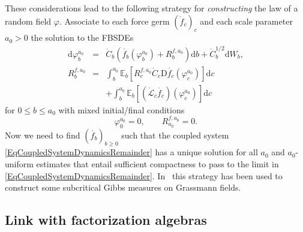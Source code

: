 \documentclass[reprint,aps]{revtex4-2}
\newcommand{\mathD}{\mathrm{D}}
\newcommand{\mathd}{\mathrm{d}}
\newcommand{\tmtextit}[1]{\textit{{{#1}}}}
\newcommand{\bbE}{\mathbb{E}}
\begin{document}
These considerations lead to the following strategy for
\tmtextit{constructing} the law of a random field $\varphi$. Associate to each
force germ $(\ring{f}_c)_c$ and each scale parameter $a_0 > 0$ the solution to
the FBSDEs
\begin{equation}
  \begin{array}{lll}
    \mathd \varphi^{a_0}_b & = & \dot{C}_b (\ring{f_b}  (\varphi^{a_0}_b) +
    R^{f, a_0}_b) \mathd b + \dot{C}_b^{1 / 2} \mathd W_b,\\
    R^{f, a_0}_b & = & \int_b^{a_0} \bbE_b  [R^{f, a_0}_c  \dot{C}_c \mathD
    \ring{f_c} (\varphi^{a_0}_c)] \mathd c\\
    &  & + \int_b^{a_0} \bbE_b [(\ring{\mathscr{L}}_c  \ring{f_c})
    (\varphi^{a_0}_c)] \mathd c
  \end{array} \label{EqCoupledSystemDynamicsRemainder}
\end{equation}
for $0 \leqslant b \leqslant a_0$ with mixed initial/final conditions
\begin{equation}
  \varphi_0^{a_0} = 0, \qquad R^{f, a_0}_{a_0} = 0.
\end{equation}
Now we need to find $(\ring{f_b} )_{b \geqslant 0}$ such that the coupled
system \eqref{EqCoupledSystemDynamicsRemainder} has a unique solution for all
$a_0$ and $a_0$-uniform estimates that entail sufficient compactness to pass
to the limit in \eqref{EqCoupledSystemDynamicsRemainder}.
In~{\cite{de_vecchi22}} this strategy has been used to construct some
subcritical Gibbs measures on Grassmann fields.

\subsection{Link with factorization algebras}
\end{document}
